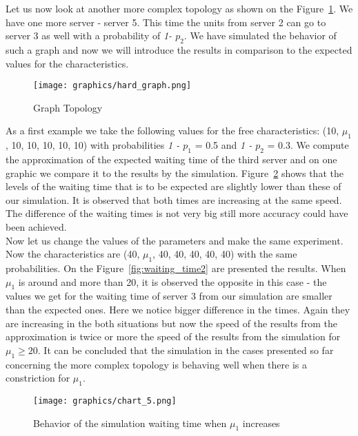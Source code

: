 \documentclass[12pt]{article}
\theoremstyle{plain}
\begin{document}
Let us now look at another more complex topology as shown on the Figure~\ref{fig:hard_graph}.
We have one more server - server 5. This time the units from server 2 can go to
server 3 as well with a probability of \emph{1- $p_2$}. We have simulated the
behavior of such a graph and now we will introduce the results in comparison to
the expected values for the characteristics.

\begin{figure}
  \caption{Graph Topology}
  \texttt{[image: graphics/hard\_graph.png]}\\
  \label{fig:hard_graph}
\end{figure}

As a first example we take the following values for the free characteristics:
(10, $\mu_1$, 10, 10, 10, 10, 10) with probabilities \emph{1 - $p_1$} = 0.5 and
\emph{1 - $p_2$} = 0.3. We compute the approximation of the expected waiting
time of the third server and on one graphic we compare it to the results by the
simulation. Figure~\ref{fig:waiting_time1} shows that the levels of the waiting time that is to
be expected are slightly lower than these of our simulation. It is observed that
both times are increasing at the same speed. The difference of the waiting times
is not very big still more accuracy could have been achieved.\\
Now let us change the values of the parameters and make the same experiment. Now
the characteristics are (40, $\mu_1$, 40, 40, 40, 40, 40) with the same probabilities.
On the Figure~\ref{fig:waiting_time2} are presented the results. When $\mu_1$ is around and more than 20, it is observed the opposite in
this case - the values we get for the waiting time of server 3 from our simulation are
smaller than the expected ones. Here we notice bigger difference in the times. Again they
are increasing in the both situations but now the speed of the results from the approximation is
twice or more the speed of the results from the simulation for $\mu_1 \ge 20$.
It can be concluded that the simulation in the cases presented so far concerning
the more complex topology is behaving well when there is a constriction for $\mu_1$.\\

\begin{figure}
  \caption{Behavior of the simulation waiting time when $\mu_1$ increases}
  \texttt{[image: graphics/chart\_5.png]}\\
  \label{fig:waiting_time1}
\end{figure}
\end{document}
